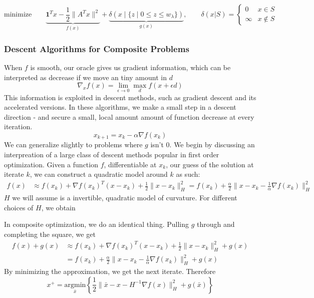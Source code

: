 \begin{example}
\[
\mbox{minimize}\qquad
\underset{f(x)}{\underbrace{\mathbf{1}^{T}x-\frac{1}{2}\|A^{T}x\|^{2}}}+
\underset{g(x)}{\underbrace{\delta(x\mid \{ z \mid 0\leq z\leq w_{\lambda} \})}},
\qquad\delta(x|S)=\begin{cases}
0 & x\in S\\
\infty & x\notin S
\end{cases}
\]

\end{example}

\subsubsection{Descent Algorithms for Composite Problems}
When $f$ is smooth,
our oracle gives us gradient information, which can be interpreted as decrease
if we move an tiny amount in $d$
$$
\nabla_x f(x) = \lim_{\epsilon \rightarrow 0}\max_d f(x + \epsilon d)
$$
This information is exploited in descent methods, such as gradient
descent and its accelerated versions. In these algorithms, we make a 
small step in a descent direction - and secure a small, local amount
amount of function decrease at every iteration. 
$$
x_{k+1} = x_k - \alpha \nabla f(x_k)
$$
We can generalize slightly to problems where $g$ isn't $0$. We begin by
discussing an interpreation of a large class of descent methods popular in
first order optimization. Given a  function $f$, differentiable at $x_k$, our
guess of the solution at  iterate $k$, we can construct a quadratic model
around $k$ as such:
\begin{align*} 
f(x) & \approx f(x_{k})+\nabla f(x_{k})^{T}(x-x_{k})+\frac{1}{2}\|x-x_{k}\|_{H}^{2} =f(x_{k})+\frac{\alpha}{2}\|x-x_{k}-\frac{1}{\alpha}\nabla f(x_{k})\|_H^{2}
\end{align*}
$H$ we will assume is a invertible, quadratic model of curvature. For
different choices of $H$, we obtain

In composite optimization, we do an identical thing. Pulling $g$ 
through and completing the square, we get
\begin{align*}
f(x)+g(x) & \approx f(x_{k})+\nabla f(x_{k})^{T}(x-x_{k})+\frac{1}{2}\|x-x_{k}\|_{H}^{2}+g(x)\\
 & =f(x_{k})+\frac{\alpha}{2}\|x-x_{k}-\frac{1}{\alpha}\nabla f(x_{k})\|_H^{2}+g(x)
\end{align*}
By minimizing the approximation, we get the next iterate. Therefore
$$
x^{+}=\underset{\bar{x}}{\mbox{argmin}}\left\{ 
\frac{1}{2}\|\bar{x}-x-H^{-1}\nabla f(x)\|_{H}^{2}
+g(\bar{x})\right\} 
$$


